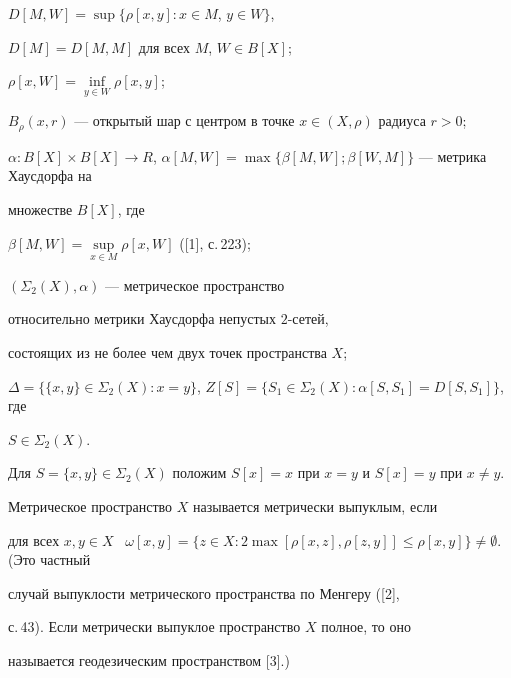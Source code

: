 $D[M,W] = \sup \{\rho[x,y] : x \in M$, $y \in W \}$,


$D[M] =D[M,M]$ для всех $M$, $W \in B[X]$;





$\rho[x,W] = \inf\limits_{y \in W}{\rho [x,y]}$;





$B_{\rho}(x,r)$ --- открытый шар с центром в точке $x \in


(X,\rho)$ радиуса $r > 0$;





$\alpha : B[X]\times B[X]\rightarrow R$, $\alpha[M,W] =


\max\{\beta [M,W];\beta [W,M]\}$ --- метрика Хаусдорфа на


множестве $B[X]$, где


$\beta [M,W] = \sup\limits_{x \in M}{\rho[x,W]}$ ([1], с.\,223);





$(\Sigma_{2} (X),\alpha)$ --- метрическое пространство


относительно метрики Хаусдорфа непустых $2$-сетей,


состоящих из не более чем двух точек пространства $X$;





$\Delta = \{\{x,y\} \in \Sigma_{2}(X) :  x = y \}$, $Z[S] =\{S_{1} \in


\Sigma_{2}(X) :  \alpha [S,S_{1}] = D[S,S_{1}] \}$, где


$S \in \Sigma_{2}(X)$.





Для $S = \{x, y\} \in \Sigma_{2}(X)$ положим $S[x] = x$ при $x =


y$ и $S[x]= y$ при $x \neq y$.


Метрическое пространство $X$ называется метрически выпуклым, если


для  всех $x, y \in X$ \ $\omega [x,y] = \{z \in X : 2\max [\rho


[x,z],\rho [z,y]]  \leq \rho [x,y] \}\neq \emptyset$. (Это частный


случай выпуклости метрического пространства по Менгеру ([2],


с.\,43). Если метрически выпуклое пространство $X$ полное, то оно


называется геодезическим пространством [3].)





